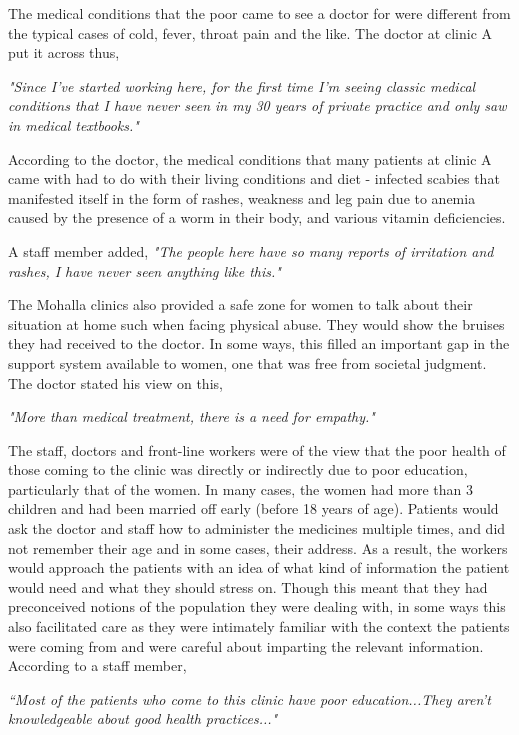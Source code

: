 The medical conditions that the poor came to see a doctor for were different from the typical cases of cold, fever, throat pain and the like. The doctor at clinic A put it across thus,

\textit{"Since I've started working here, for the first time I'm seeing classic medical conditions that I have never seen in my 30 years of private practice and only saw in medical textbooks."}

According to the doctor, the medical conditions that many patients at clinic A came with had to do with their living conditions and diet - infected scabies that manifested itself in the form of rashes, weakness and leg pain due to anemia caused by the presence of a worm in their body, and various vitamin deficiencies.

A staff member added,
\textit{"The people here have so many reports of irritation and rashes, I have never seen anything like this."}

The Mohalla clinics also provided a safe zone for women to talk about their situation at home such when facing physical abuse. They would show the bruises they had received to the doctor. In some ways, this filled an important gap in the support system available to women, one that was free from societal judgment. The doctor stated his view on this, 

\textit{"More than medical treatment, there is a need for empathy."}

The staff, doctors and front-line workers were of the view that the poor health of those coming to the clinic was directly or indirectly due to poor education, particularly that of the women. In many cases, the women had more than 3 children and had been married off early (before 18 years of age). Patients would ask the doctor and staff how to administer the medicines multiple times, and did not remember their age and in some cases, their address. As a result, the workers would approach the patients with an idea of what kind of information the patient would need and what they should stress on. Though this meant that they had preconceived notions of the population they were dealing with, in some ways this also facilitated care as they were intimately familiar with the context the patients were coming from and were careful about imparting the relevant information. According to a staff member,

\textit{“Most of the patients who come to this clinic have poor education...They aren’t knowledgeable about good health practices..."}

